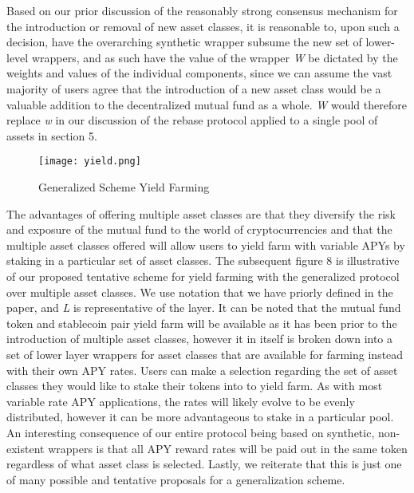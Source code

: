 \documentclass[12pt]{article}
\begin{document}
    \vspace{0.15cm}
    
    Based on our prior discussion of the reasonably strong consensus mechanism for the introduction or removal of new asset classes, it is reasonable to, upon such a decision, have the overarching synthetic wrapper subsume the new set of lower-level wrappers, and as such have the value of the wrapper \emph{W} be dictated by the weights and values of the individual components, since we can assume the vast majority of users agree that the introduction of a new asset class would be a valuable addition to the decentralized mutual fund as a whole. \emph{W} would therefore replace \emph{w} in our discussion of the rebase protocol applied to a single pool of assets in section 5. \par
    
    \begin{figure}[!htb]
        \centering
        \texttt{[image: yield.png]}
        \caption{Generalized Scheme Yield Farming}
        \label{fig:my_label}
    \end{figure}
    
    \vspace{0.15cm}
    
    The advantages of offering multiple asset classes are that they diversify the risk and exposure of the mutual fund to the world of cryptocurrencies and that the multiple asset classes offered will allow users to yield farm with variable APYs by staking in a particular set of asset classes. The subsequent figure 8 is illustrative of our proposed tentative scheme for yield farming with the generalized protocol over multiple asset classes. We use notation that we have priorly defined in the paper, and \emph{L} is representative of the layer. It can be noted that the mutual fund token and stablecoin pair yield farm will be available as it has been prior to the introduction of multiple asset classes, however it in itself is broken down into a set of lower layer wrappers for asset classes that are available for farming instead with their own APY rates. Users can make a selection regarding the set of asset classes they would like to stake their tokens into to yield farm. As with most variable rate APY applications, the rates will likely evolve to be evenly distributed, however it can be more advantageous to stake in a particular pool. An interesting consequence of our entire protocol being based on synthetic, non-existent wrappers is that all APY reward rates will be paid out in the same token regardless of what asset class is selected. Lastly, we reiterate that this is just one of many possible and tentative proposals for a generalization scheme.
    
    
    
\end{document}

